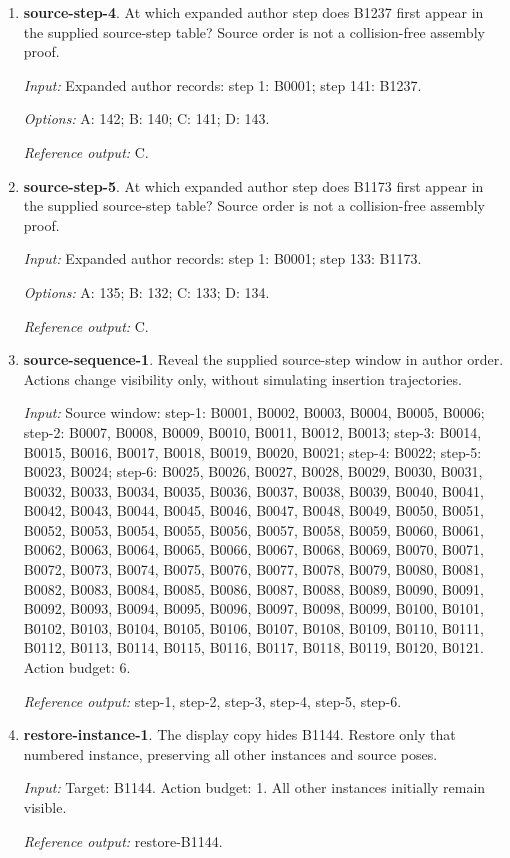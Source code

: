 \begin{enumerate}
\item \textbf{source-step-4}. At which expanded author step does B1237 first appear in the supplied source-step table? Source order is not a collision-free assembly proof.\par {\small \textit{Input:} Expanded author records: step 1: B0001; step 141: B1237. \par\textit{Options:} A: 142; B: 140; C: 141; D: 143. \par\textit{Reference output:} C.}
\item \textbf{source-step-5}. At which expanded author step does B1173 first appear in the supplied source-step table? Source order is not a collision-free assembly proof.\par {\small \textit{Input:} Expanded author records: step 1: B0001; step 133: B1173. \par\textit{Options:} A: 135; B: 132; C: 133; D: 134. \par\textit{Reference output:} C.}
\item \textbf{source-sequence-1}. Reveal the supplied source-step window in author order. Actions change visibility only, without simulating insertion trajectories.\par {\small \textit{Input:} Source window: step-1: B0001, B0002, B0003, B0004, B0005, B0006; step-2: B0007, B0008, B0009, B0010, B0011, B0012, B0013; step-3: B0014, B0015, B0016, B0017, B0018, B0019, B0020, B0021; step-4: B0022; step-5: B0023, B0024; step-6: B0025, B0026, B0027, B0028, B0029, B0030, B0031, B0032, B0033, B0034, B0035, B0036, B0037, B0038, B0039, B0040, B0041, B0042, B0043, B0044, B0045, B0046, B0047, B0048, B0049, B0050, B0051, B0052, B0053, B0054, B0055, B0056, B0057, B0058, B0059, B0060, B0061, B0062, B0063, B0064, B0065, B0066, B0067, B0068, B0069, B0070, B0071, B0072, B0073, B0074, B0075, B0076, B0077, B0078, B0079, B0080, B0081, B0082, B0083, B0084, B0085, B0086, B0087, B0088, B0089, B0090, B0091, B0092, B0093, B0094, B0095, B0096, B0097, B0098, B0099, B0100, B0101, B0102, B0103, B0104, B0105, B0106, B0107, B0108, B0109, B0110, B0111, B0112, B0113, B0114, B0115, B0116, B0117, B0118, B0119, B0120, B0121. Action budget: 6. \par\textit{Reference output:} step-1, step-2, step-3, step-4, step-5, step-6.}
\item \textbf{restore-instance-1}. The display copy hides B1144. Restore only that numbered instance, preserving all other instances and source poses.\par {\small \textit{Input:} Target: B1144. Action budget: 1. All other instances initially remain visible. \par\textit{Reference output:} restore-B1144.}

\end{enumerate}
